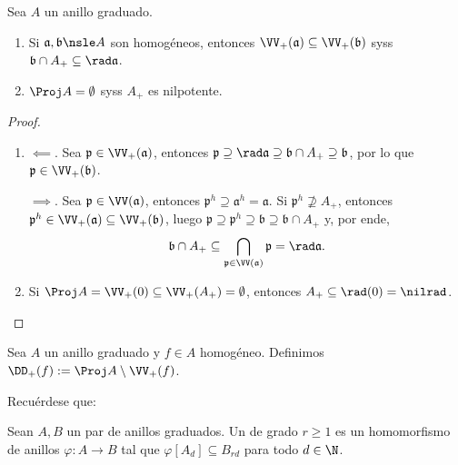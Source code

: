 \begin{prop}
	Sea $A$ un anillo graduado.
	\begin{enumerate}
		\item Si $\mathfrak{a, b} \nsle A$ son homogéneos, entonces $\VV_+(\mathfrak{a}) \subseteq \VV_+(\mathfrak{b})$
			syss $\mathfrak{b} \cap A_+ \subseteq \rad\mathfrak{a}$.
		\item $\Proj A = \emptyset$ syss $A_+$ es nilpotente.
	\end{enumerate}
\end{prop}
\begin{proof}
	\begin{enumerate}
		\item $\impliedby.$ Sea $\mathfrak{p} \in \VV_+(\mathfrak{a})$, entonces $\mathfrak{p} \supseteq \rad\mathfrak{a}
			\supseteq \mathfrak{b} \cap A_+ \supseteq \mathfrak{b}$, por lo que $\mathfrak{p} \in \VV_+(\mathfrak{b})$.

			$\implies.$ Sea $\mathfrak{p} \in \VV(\mathfrak{a})$, entonces $\mathfrak{p}^h \supseteq \mathfrak{a}^h = \mathfrak{a}$.
			Si $\mathfrak{p}^h \nsupseteq A_+$, entonces $\mathfrak{p}^h \in \VV_+(\mathfrak{a}) \subseteq \VV_+(\mathfrak{b})$, luego
			$\mathfrak{p} \supseteq \mathfrak{p}^h \supseteq \mathfrak{b} \supseteq \mathfrak{b} \cap A_+$ y, por ende,
			$$ \mathfrak{b} \cap A_+ \subseteq \bigcap_{\mathfrak{p} \in \VV(\mathfrak{a})} \mathfrak{p} = \rad\mathfrak{a}. $$

		\item Si $\Proj A = \VV_+(0) \subseteq \VV_+(A_+) = \emptyset$, entonces $A_+ \subseteq \rad(0) = \nilrad$. \qedhere
	\end{enumerate}
\end{proof}
\begin{mydef}
	Sea $A$ un anillo graduado y $f \in A$ homogéneo. Definimos $\DD_+(f) := \Proj A \setminus \VV_+(f)$.
\end{mydef}
Recuérdese que:
\begin{mydef}
	Sean $A, B$ un par de anillos graduados.
	Un  de grado $r \ge 1$ es un
	homomorfismo de anillos $\varphi \colon A \to B$ tal que $\varphi[A_d] \subseteq B_{rd}$ para todo $d \in \N$.
\end{mydef}

